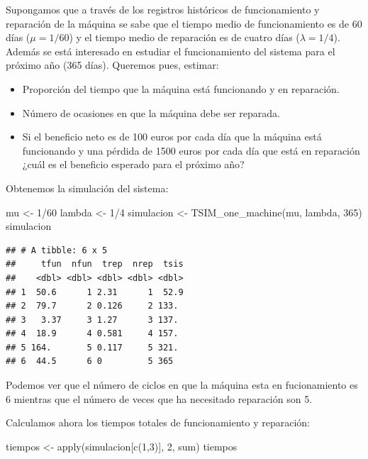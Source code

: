 \documentclass[
]{book}
\newenvironment{Shaded}{\begin{snugshade}}{\end{snugshade}}
\newcommand{\DecValTok}[1]{\textcolor[rgb]{0.00,0.00,0.81}{#1}}
\newcommand{\FunctionTok}[1]{\textcolor[rgb]{0.00,0.00,0.00}{#1}}
\newcommand{\NormalTok}[1]{#1}
\newcommand{\OtherTok}[1]{\textcolor[rgb]{0.56,0.35,0.01}{#1}}
\newcommand{\SpecialCharTok}[1]{\textcolor[rgb]{0.00,0.00,0.00}{#1}}
\providecommand{\tightlist}{%
  \setlength{\itemsep}{0pt}\setlength{\parskip}{0pt}}
\theoremstyle{definition}
\theoremstyle{definition}
\theoremstyle{definition}
\theoremstyle{definition}
\theoremstyle{remark}
\begin{document}
Supongamos que a través de los registros históricos de funcionamiento y reparación de la máquina se sabe que el tiempo medio de funcionamiento es de 60 días (\(\mu = 1/60\)) y el tiempo medio de reparación es de cuatro días (\(\lambda = 1/4\)). Además se está interesado en estudiar el funcionamiento del sistema para el próximo año (365 días). Queremos pues, estimar:

\begin{itemize}
\tightlist
\item
  Proporción del tiempo que la máquina está funcionando y en reparación.
\item
  Número de ocasiones en que la máquina debe ser reparada.
\item
  Si el beneficio neto es de 100 euros por cada día que la máquina está funcionando y una pérdida de 1500 euros por cada día que está en reparación ¿cuál es el beneficio esperado para el próximo año?
\end{itemize}

Obtenemos la simulación del sistema:

\begin{Shaded}
\begin{Highlighting}[]
\NormalTok{mu }\OtherTok{\textless{}{-}} \DecValTok{1}\SpecialCharTok{/}\DecValTok{60}
\NormalTok{lambda }\OtherTok{\textless{}{-}} \DecValTok{1}\SpecialCharTok{/}\DecValTok{4}
\NormalTok{simulacion }\OtherTok{\textless{}{-}} \FunctionTok{TSIM\_one\_machine}\NormalTok{(mu, lambda, }\DecValTok{365}\NormalTok{)}
\NormalTok{simulacion}
\end{Highlighting}
\end{Shaded}

\begin{verbatim}
## # A tibble: 6 x 5
##     tfun  nfun  trep  nrep  tsis
##    <dbl> <dbl> <dbl> <dbl> <dbl>
## 1  50.6      1 2.31      1  52.9
## 2  79.7      2 0.126     2 133. 
## 3   3.37     3 1.27      3 137. 
## 4  18.9      4 0.581     4 157. 
## 5 164.       5 0.117     5 321. 
## 6  44.5      6 0         5 365
\end{verbatim}

Podemos ver que el número de ciclos en que la máquina esta en fucionamiento es 6 mientras que el número de veces que ha necesitado reparación son 5.

Calculamos ahora los tiempos totales de funcionamiento y reparación:

\begin{Shaded}
\begin{Highlighting}[]
\NormalTok{tiempos }\OtherTok{\textless{}{-}} \FunctionTok{apply}\NormalTok{(simulacion[}\FunctionTok{c}\NormalTok{(}\DecValTok{1}\NormalTok{,}\DecValTok{3}\NormalTok{)], }\DecValTok{2}\NormalTok{, sum)}
\NormalTok{tiempos}
\end{Highlighting}
\end{Shaded}
\end{document}
